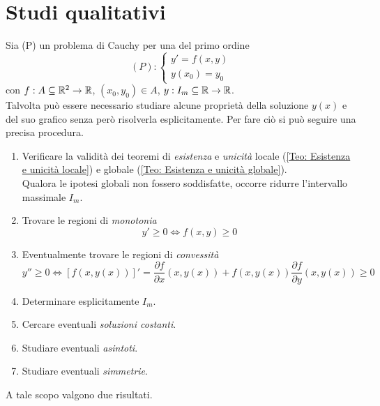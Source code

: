 \section{Studi qualitativi}
Sia (P) un problema di Cauchy per una \ode del primo ordine
\begin{equation}
    (P): \begin{cases}
        y'=f(x,y)\\
        y(x_0)=y_0
    \end{cases}
\end{equation}
con $f: A \subseteq \mathbb{R}^2 \to \mathbb{R}$, $(x_0, y_0) \in A$, $y:I_m \subseteq \mathbb{R} \to \mathbb{R}$.\\
Talvolta può essere necessario studiare alcune proprietà della soluzione $y(x)$ e del suo grafico senza però risolverla esplicitamente.
Per fare ciò si può seguire una precisa procedura.
\begin{enumerate}
    \item Verificare la validità dei teoremi di \textit{esistenza} e \textit{unicità} locale (\ref{Teo: Esistenza e unicità locale}) e globale (\ref{Teo: Esistenza e unicità globale}).\\
    Qualora le ipotesi globali non fossero soddisfatte, occorre ridurre l'intervallo massimale $I_m$.
    \item Trovare le regioni di \textit{monotonia}
    \begin{equation}
        y'\geq 0 \iff f(x,y) \geq 0
    \end{equation}
    \item Eventualmente trovare le regioni di \textit{convessità}
    \begin{equation}
        y'' \geq 0 \iff [f(x,y(x))]' = \frac{\partial f}{\partial x}(x,y(x))+ f(x,y(x)) \frac{\partial f}{\partial y}(x,y(x)) \geq 0
    \end{equation}
    \item Determinare esplicitamente $I_m$.
    \item Cercare eventuali \textit{soluzioni costanti}.
    \item Studiare eventuali \textit{asintoti}.
    \item Studiare eventuali \textit{simmetrie}.
\end{enumerate}
A tale scopo valgono due risultati.
